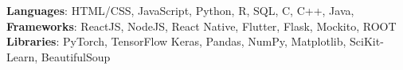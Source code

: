   \begin{itemize}[leftmargin=0.15in, label={}] 
    \small{\item{
      \textbf{Languages}: HTML/CSS, JavaScript, Python, R, SQL, C, C++, Java, \\
      \textbf{Frameworks}: ReactJS, NodeJS, React Native, Flutter, Flask, Mockito, ROOT  \\
      \textbf{Libraries}: PyTorch, TensorFlow Keras, Pandas, NumPy, Matplotlib, SciKit-Learn, BeautifulSoup
       }}
\end{itemize}